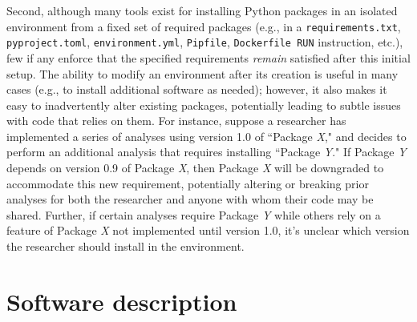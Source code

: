 \documentclass[preprint,12pt, a4paper]{elsarticle}
\begin{document}
Second, although many tools exist for installing Python packages in an isolated environment from a fixed set of required packages (e.g., in a \texttt{requirements.txt}, \texttt{pyproject.toml}, \texttt{environment.yml}, \texttt{Pipfile}, \texttt{Dockerfile RUN} instruction, etc.), few if any enforce that the specified requirements \textit{remain} satisfied after this initial setup. 
The ability to modify an environment after its creation is useful in many cases (e.g., to install additional software as needed); however, it also makes it easy to inadvertently alter existing packages, potentially leading to subtle issues with code that relies on them. 
For instance, suppose a researcher has implemented a series of analyses using version 1.0 of ``Package \textit{X}," and decides to  perform an additional analysis that requires installing ``Package \textit{Y}." 
If Package \textit{Y} depends on version 0.9 of Package \textit{X}, then Package \textit{X} will be downgraded to accommodate this new requirement, potentially altering or breaking prior analyses for both the researcher and anyone with whom their code may be shared. 
Further, if certain analyses require Package \textit{Y} while others rely on a feature of Package \textit{X} not implemented until version 1.0, it's unclear which version the researcher should install in the environment.









\section{Software description}
\end{document}
